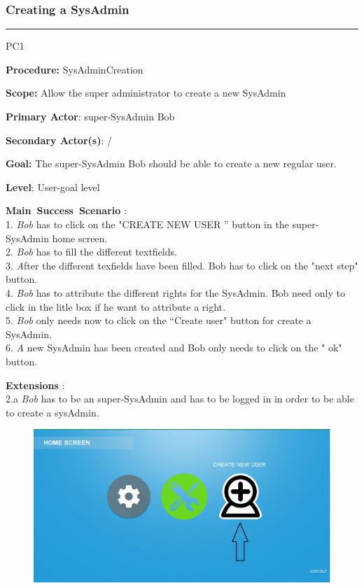 \subsubsection{Creating a SysAdmin}

\hrule
\vspace{0.5cm}
\begin{lyxlist}{PC1}
\small{
\item [\textbf{Procedure:}] SysAdminCreation 
\item [\textbf{Scope:}] Allow the super administrator to create a new SysAdmin
\item [\textbf{Primary Actor}:] super-SysAdmin Bob
\item [\textbf{Secondary Actor(s)}:] /
\item [\textbf{Goal:}] The super-SysAdmin Bob should be able to create a new
regular user.
\item [\textbf{Level}:] User-goal level
\item [\textbf{Main~Success~Scenario}]:\\
1. \emph{Bob} has to click on the "CREATE NEW USER '' button in the super-SysAdmin home
screen.\\
2. \emph{Bob} has to fill the different textfields.\\
3. \emph After the different texfields have been filled. {Bob} has to click on
the "next step" button.\\
4. \emph{Bob} has to attribute the different rights for the SysAdmin.
{Bob} need only to click in the litle box if he want to attribute a right.\\
5. \emph{Bob} only needs now to click on the ``Create user" button for create a
SysAdmin.
\\
6. \emph A new SysAdmin has been created and {Bob} only needs to click
on the " ok" button.\\

\item [\textbf{Extensions}]:\\
2.a \emph{Bob} has to be an super-SysAdmin and has to be logged in in order to
be able to create a sysAdmin.\\
}

\begin{figure}[H]
\centering
\includegraphics[width=170mm]{images/CreateSys11.eps}
\caption{\label{overflow}}
\end{figure}


\end{lyxlist}
